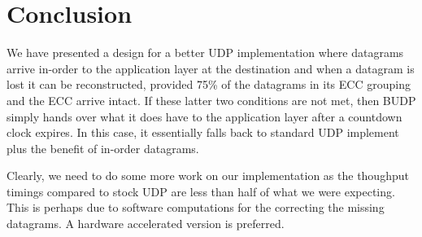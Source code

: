 \documentclass[conference]{IEEEtran}
\theoremstyle{definition}
\begin{document}
%





\section{Conclusion}
We have presented a design for a better UDP implementation
where datagrams arrive in-order to the application layer
at the destination and when a datagram is lost it can be
reconstructed, provided 75\% of the datagrams in its ECC
grouping and the ECC arrive intact.  If these latter two
conditions are not met, then BUDP simply hands over what
it does have to the application layer after a countdown
clock expires.  In this case, it essentially falls back
to standard UDP implement plus the benefit of in-order
datagrams.

Clearly, we need to do some more work on our implementation
as the thoughput timings compared to stock UDP are less than
half of what we were expecting.  This is perhaps due to
software computations for the correcting the missing datagrams.
A hardware accelerated version is preferred.
\end{document}
